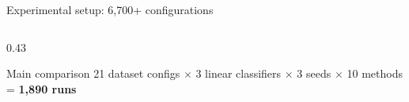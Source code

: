 \begin{frame}{Experimental setup: 6,700+ configurations}
\begin{columns}[T,onlytextwidth]
\begin{column}{0.43\textwidth}
\vspace{0.3em}
\begin{block}{Main comparison}
\scriptsize
21 dataset configs $\times$ 3 linear classifiers $\times$ 3 seeds $\times$ 10 methods = \textbf{1,890 runs}
\end{block}
\end{column}
\end{columns}
\end{frame}
